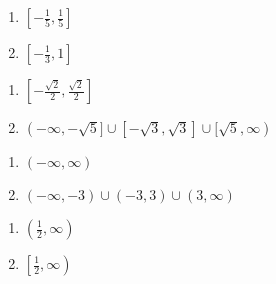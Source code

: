 \begin{multicols}{2}

\begin{enumerate}

\setcounter{enumi}{\value{HW}}

\item  $\left[-\frac{1}{5}, \frac{1}{5}\right]$
\item  $\left[-\frac{1}{3}, 1 \right]$

\setcounter{HW}{\value{enumi}}

\end{enumerate}

\end{multicols}

\begin{multicols}{2}

\begin{enumerate}

\setcounter{enumi}{\value{HW}}

\item   $\left[-\frac{\sqrt{2}}{2}, \frac{\sqrt{2}}{2}\right]$ 
\item  $(-\infty, -\sqrt{5}] \cup [-\sqrt{3}, \sqrt{3}] \cup [\sqrt{5}, \infty)$ 

\setcounter{HW}{\value{enumi}}

\end{enumerate}

\end{multicols}

\begin{multicols}{2}

\begin{enumerate}

\setcounter{enumi}{\value{HW}}

\item $(-\infty, \infty)$
\item  $(-\infty, -3) \cup (-3,3) \cup (3, \infty)$

\setcounter{HW}{\value{enumi}}

\end{enumerate}

\end{multicols}

\begin{multicols}{2}

\begin{enumerate}

\setcounter{enumi}{\value{HW}}

\item  $\left(\frac{1}{2}, \infty \right)$
\item  $\left[\frac{1}{2}, \infty \right)$

\setcounter{HW}{\value{enumi}}

\end{enumerate}

\end{multicols}

